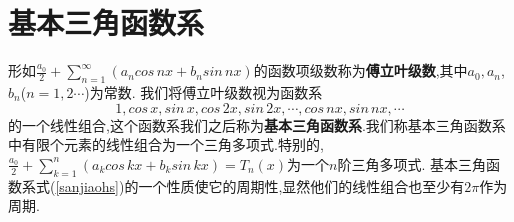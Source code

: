 \documentclass{ctexbook}
\newcommand{\refeq}[1]{式(\ref{#1})}
\theoremstyle{plain}
\theoremstyle{definition}
\begin{document}
\section{基本三角函数系}
\noindent
形如$\frac{a_0}{2}+\sum_{n=1}^{\infty}(a_ncos\,nx+b_nsin\,nx)$的函数项级数称为\textbf{傅立叶级数},其中$a_0,a_n$,$b_n$($n=1,2\cdots$)为常数.
我们将傅立叶级数视为函数系
\begin{equation}\label{sanjiaohs}
1,cos\, x,sin\, x,cos\, 2x,sin\, 2x ,\cdots ,cos\, nx,sin\, nx,\cdots
\end{equation}
的一个线性组合,这个函数系我们之后称为\textbf{基本三角函数系}.我们称基本三角函数系中有限个元素的线性组合为一个三角多项式.特别的,\\
$\frac{a_0}{2}+\sum_{k=1}^{n}(a_kcos\,kx+b_ksin\,kx)=T_n(x)$为一个$n$阶三角多项式.
基本三角函数系\refeq{sanjiaohs}的一个性质使它的周期性,显然他们的线性组合也至少有$2\pi$作为周期.
\end{document}
